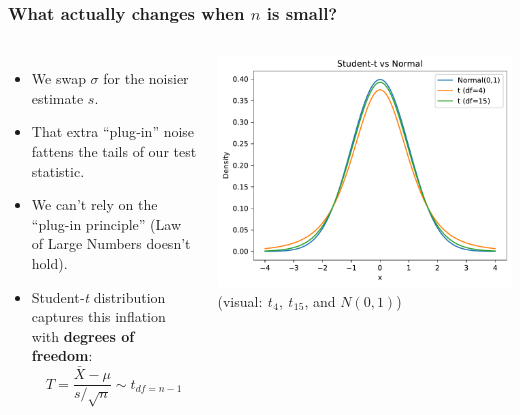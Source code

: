 \documentclass[handout]{beamer}
\begin{document}
\begin{frame}
\frametitle{What actually changes when \(n\) is small?}
\begin{columns}[T]
\small
\begin{itemize}
  \item We swap \(\sigma\) for the noisier estimate \(s\).
  \item That extra “plug‑in” noise fattens the tails of our test statistic.
  \item We can't rely on the ``plug-in principle'' (Law of Large Numbers doesn't hold).
  \item Student‑\textit{t} distribution captures this inflation with \textbf{degrees of freedom}:
        \[
        T=\frac{\bar X-\mu}{s/\sqrt n}\sim t_{df=n-1}
        \]
\end{itemize}

\centering
\vspace{2em}
\includegraphics[width=\textwidth]{Figures/t_vs_norm.pdf}\\
\small (visual: \textit{t}\(_{\,4}\), \textit{t}\(_{\,15}\), and \(N(0,1)\))
\end{columns}
\end{frame}
\end{document}
